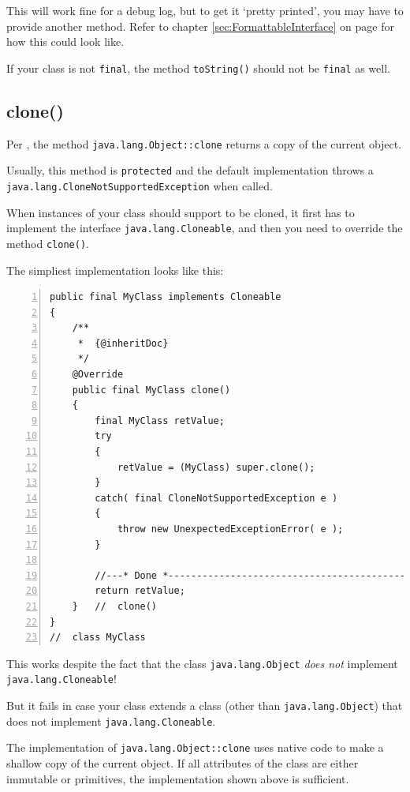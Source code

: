 \documentclass[11pt,a4paper, titlepage, parskip=half, headsepline, footsepline, cleardoublepage=current, headheight=1cm]{scrbook}
\newcommand*{\tqvref}[1]{\hyperref[{#1}]{\ref*{#1}} on page \pageref{#1}}
\begin{document}
This will work fine for a debug log, but to get it ‘pretty printed’, you may have to provide another method. Refer to chapter \tqvref{sec:FormattableInterface} for how
this could look like.

If your class is not \lstinline|final|, the method \lstinline|toString()| should not be \lstinline|final| as well. 

\subsection{clone()}\label{sec:Clone}
Per \autocite{ORACLE_DOC_OBJECT_CLASS:clone}, the method \lstinline|java.lang.Object::clone| returns a copy of the current object.

Usually, this method is \lstinline|protected| and the default implementation throws a \lstinline|java.lang.CloneNotSupportedException|\autocite{ORACLE_DOC_CLONENOTSUPPORTEDEXCEPITON_CLASS} when called.

When instances of your class should support to be cloned, it first has to implement the interface \lstinline|java.lang.Cloneable|\autocite{ORACLE_DOC_CLONEABLE_INTERFACE}, and then you need to override the method \lstinline|clone()|.

The simpliest implementation looks like this:
\begin{lstlisting}[numbers=left,caption={A simple clone() Method}]
public final MyClass implements Cloneable
{
    /**
     *  {@inheritDoc}
     */
    @Override
    public final MyClass clone()
    {
        final MyClass retValue;
        try
        {
            retValue = (MyClass) super.clone();
        }    
        catch( final CloneNotSupportedException e )
        {
            throw new UnexpectedExceptionError( e );
        }
        
        //---* Done *------------------------------------------------
        return retValue;
    }   //  clone() 
}
//  class MyClass
\end{lstlisting}
This works despite the fact that the class \lstinline|java.lang.Object| \textit{does not} implement \lstinline|java.lang.Cloneable|!

But it fails in case your class extends a class (other than \lstinline|java.lang.Object|) that does not implement \lstinline|java.lang.Cloneable|.

The implementation of \lstinline|java.lang.Object::clone| uses native code to make a shallow copy of the current object. If all attributes of the class are either immutable or primitives, the implementation shown above is sufficient.
\end{document}

